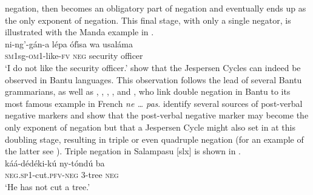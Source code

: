 \documentclass[output=paper]{langsci/langscibook}
\begin{document}
negation, then becomes an obligatory part of negation and eventually ends
up as the only exponent of negation. This final stage, with only a single
negator, is illustrated with the Manda example in
.  
\ea\label{ex:manda-security}
\\ 
\gll ni-ng'-g{\'a}n-a l{\'e}pa {{\'o}f{\'\i}sa wa usal{\'a}ma}\\
\textsc{sm1}sg-\textsc{om}1-like-\textsc{fv} \textsc{neg} {security
officer}\\ \glt `I do not like the security officer.' \z
\citet{DevosAuwera2013} show that the Jespersen Cycles can indeed be
observed in Bantu languages. This observation follows the lead of several
Bantu grammarians, as well as \citet[256--258]{Guldemann1996},
\citet[7]{GuldemannHagemeijer2006}, \citet[165]{Guldemann2008},
\citet[57]{Nurse2008}, and \citet[117]{Guldemann2011}, who link double
negation in Bantu to its most famous example in French \textit{ne \ldots{}
pas}. \citet{DevosAuwera2013} identify several sources of post-verbal
negative markers and show that the post-verbal negative marker may become
the only exponent of negation but that a Jespersen Cycle might also set in
at this doubling stage, resulting in triple or even quadruple negation (for
an example of the latter see \citealt{DevosTshibanda2010}). Triple negation
in Salampasu [slx] is shown in
.
\ea\label{ex:salampasu-cut} \\
\gll k{\'a}{\'a}-d{\'e}d{\'e}ki-k{\'u} ny-t{\'o}nd{\'u}  ba\\
\textsc{neg.sp}1-cut.\textsc{pfv-neg} 3-tree \textsc{neg}\\ \glt `He has
not cut a tree.' \z 
\end{document}
